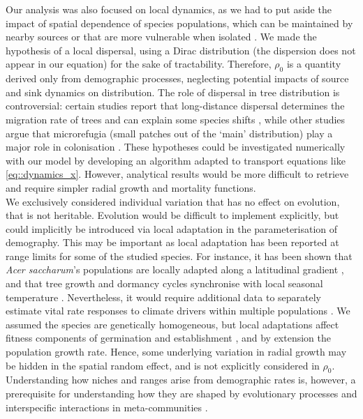 Our analysis was also focused on local dynamics, as we had to put aside the impact of spatial dependence of species populations, which can be maintained by nearby sources or that are more vulnerable when isolated \citep{Pulliam2000}. We made the hypothesis of a local dispersal, using a Dirac distribution (\ie the dispersion does not appear in our equation) for the sake of tractability. Therefore, $ \rho_0 $ is a quantity derived only from demographic processes, neglecting potential impacts of source and sink dynamics on distribution. The role of dispersal in tree distribution is controversial: certain studies report that long-distance dispersal determines the migration rate of trees and can explain some species shifts \citep[and references therein]{Nathan2002}, while other studies argue that microrefugia (small patches out of the `main' distribution) play a major role in colonisation \citep[and references therein]{Feurdean2013}. These hypotheses could be investigated numerically with our model by developing an algorithm adapted to transport equations like \eqref{eq::dynamics_x}. However, analytical results would be more difficult to retrieve and require simpler radial growth and mortality functions. \\

We exclusively considered individual variation that has no effect on evolution, \ie that is not heritable. Evolution would be difficult to implement explicitly, but could implicitly be introduced via local adaptation in the parameterisation of demography. This may be important as local adaptation has been reported at range limits for some of the studied species.  For instance, it has been shown that \textit{Acer saccharum}'s populations are locally adapted along a latitudinal gradient \citep{Solarik2016}, and that tree growth and dormancy cycles synchronise with local seasonal temperature \citep{Aitken2008}. Nevertheless, it would require additional data to separately estimate vital rate responses to climate drivers within multiple populations \citep{Peterson2019}. We assumed the species are genetically homogeneous, but local adaptations affect fitness components of germination and establishment \citep{Alberto2013}, and by extension the population growth rate. Hence, some underlying variation in radial growth may be hidden in the spatial random effect, and is not explicitly considered in $ \rho_0 $. Understanding how niches and ranges arise from demographic rates is, however, a prerequisite for understanding how they are shaped by evolutionary processes and interspecific interactions in meta-communities \citep{Schurr2012}.

